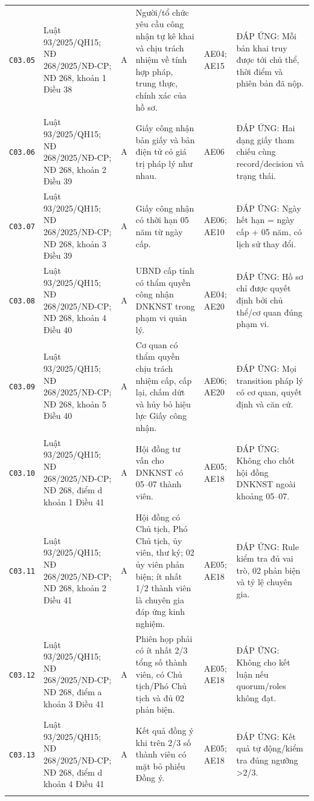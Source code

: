 \begin{longtable}{@{}p{0.9cm}p{3.0cm}p{0.55cm}p{4.05cm}p{2.0cm}p{3.45cm}@{}}
\texttt{C03.05} & Luật 93/2025/QH15; NĐ 268/2025/NĐ-CP; NĐ 268, khoản 1 Điều 38 & A & Người/tổ chức yêu cầu công nhận tự kê khai và chịu trách nhiệm về tính hợp pháp, trung thực, chính xác của hồ sơ. & AE04; AE15 & ĐÁP ỨNG: Mỗi bản khai truy được tới chủ thể, thời điểm và phiên bản đã nộp. \\ \addlinespace[1pt]
\texttt{C03.06} & Luật 93/2025/QH15; NĐ 268/2025/NĐ-CP; NĐ 268, khoản 2 Điều 39 & A & Giấy công nhận bản giấy và bản điện tử có giá trị pháp lý như nhau. & AE06 & ĐÁP ỨNG: Hai dạng giấy tham chiếu cùng record/decision và trạng thái. \\ \addlinespace[1pt]
\texttt{C03.07} & Luật 93/2025/QH15; NĐ 268/2025/NĐ-CP; NĐ 268, khoản 3 Điều 39 & A & Giấy công nhận có thời hạn 05 năm từ ngày cấp. & AE06; AE10 & ĐÁP ỨNG: Ngày hết hạn = ngày cấp + 05 năm, có lịch sử thay đổi. \\ \addlinespace[1pt]
\texttt{C03.08} & Luật 93/2025/QH15; NĐ 268/2025/NĐ-CP; NĐ 268, khoản 4 Điều 40 & A & UBND cấp tỉnh có thẩm quyền công nhận DNKNST trong phạm vi quản lý. & AE04; AE20 & ĐÁP ỨNG: Hồ sơ chỉ được quyết định bởi chủ thể/cơ quan đúng phạm vi. \\ \addlinespace[1pt]
\texttt{C03.09} & Luật 93/2025/QH15; NĐ 268/2025/NĐ-CP; NĐ 268, khoản 5 Điều 40 & A & Cơ quan có thẩm quyền chịu trách nhiệm cấp, cấp lại, chấm dứt và hủy bỏ hiệu lực Giấy công nhận. & AE06; AE20 & ĐÁP ỨNG: Mọi transition pháp lý có cơ quan, quyết định và căn cứ. \\ \addlinespace[1pt]
\texttt{C03.10} & Luật 93/2025/QH15; NĐ 268/2025/NĐ-CP; NĐ 268, điểm d khoản 1 Điều 41 & A & Hội đồng tư vấn cho DNKNST có 05--07 thành viên. & AE05; AE18 & ĐÁP ỨNG: Không cho chốt hội đồng DNKNST ngoài khoảng 05--07. \\ \addlinespace[1pt]
\texttt{C03.11} & Luật 93/2025/QH15; NĐ 268/2025/NĐ-CP; NĐ 268, khoản 2 Điều 41 & A & Hội đồng có Chủ tịch, Phó Chủ tịch, ủy viên, thư ký; 02 ủy viên phản biện; ít nhất 1/2 thành viên là chuyên gia đáp ứng kinh nghiệm. & AE05; AE18 & ĐÁP ỨNG: Rule kiểm tra đủ vai trò, 02 phản biện và tỷ lệ chuyên gia. \\ \addlinespace[1pt]
\texttt{C03.12} & Luật 93/2025/QH15; NĐ 268/2025/NĐ-CP; NĐ 268, điểm a khoản 3 Điều 41 & A & Phiên họp phải có ít nhất 2/3 tổng số thành viên, có Chủ tịch/Phó Chủ tịch và đủ 02 phản biện. & AE05; AE18 & ĐÁP ỨNG: Không cho kết luận nếu quorum/roles không đạt. \\ \addlinespace[1pt]
\texttt{C03.13} & Luật 93/2025/QH15; NĐ 268/2025/NĐ-CP; NĐ 268, điểm d khoản 4 Điều 41 & A & Kết quả đồng ý khi trên 2/3 số thành viên có mặt bỏ phiếu Đồng ý. & AE05; AE18 & ĐÁP ỨNG: Kết quả tự động/kiểm tra đúng ngưỡng >2/3. \\ \addlinespace[1pt]

\end{longtable}
